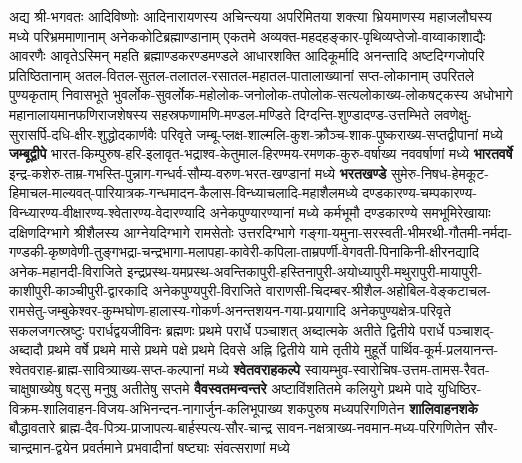 अद्य श्री-भगवतः आदिविष्णोः आदिनारायणस्य अचिन्त्यया अपरिमितया शक्त्या भ्रियमाणस्य महाजलौघस्य मध्ये
परिभ्रम\-माणानाम् अनेक\-कोटि\-ब्रह्माण्डानाम् एकतमे अव्यक्त-महदहङ्कार-पृथिव्यप्तेजो-वाय्वाकाशाद्यैः आवरणैः
आवृते\-ऽस्मिन् महति ब्रह्माण्डकरण्डमण्डले आधारशक्ति आदिकूर्मादि अनन्तादि अष्टदिग्गजोपरि
प्रतिष्ठितानाम् अतल-वितल-सुतल-तलातल-रसातल-महातल-पातालाख्यानां सप्त-लोकानाम् उपरितले
पुण्यकृताम् निवासभूते
भुवर्लोक-सुवर्लोक-महोलोक-जनोलोक-तपोलोक-सत्यलोकाख्य-लोकषट्कस्य अधोभागे महानालायमान\-फणि\-राज\-शेषस्य
सहस्र\-फणामणि-मण्डल-मण्डिते दिग्दन्ति-शुण्डादण्ड-उत्तम्भिते
लवणेक्षु-सुरासर्पि-दधि-क्षीर-शुद्धोदकार्णवैः परिवृते
जम्बू-प्लक्ष-शाल्मलि-कुश-क्रौञ्च-शाक-पुष्कराख्य-सप्तद्वीपानां मध्ये \textbf{जम्बूद्वीपे}
भारत-किम्पुरुष-हरि-इलावृत-भद्राश्व-केतुमाल-हिरण्मय-रमणक-कुरु-वर्षाख्य नववर्षाणां मध्ये \textbf{भारतवर्षे}
इन्द्र-कशेरु-ताम्र-गभस्ति-पुन्नाग-गन्धर्व-सौम्य-वरुण-भरत-खण्डानां मध्ये \textbf{भरतखण्डे}
सुमेरु-निषध-हेमकूट-हिमाचल-माल्यवत्-पारियात्रक-गन्धमादन-कैलास-विन्ध्याचलादि-महा\-शैल\-मध्ये
दण्डकारण्य-चम्पकारण्य-विन्ध्यारण्य-वीक्षारण्य-श्वेतारण्य-वेदारण्यादि अनेक\-पुण्या\-रण्यानां मध्ये
कर्मभूमौ दण्डकारण्ये समभूमिरेखायाः दक्षिणदिग्भागे श्रीशैलस्य आग्नेयदिग्भागे रामसेतोः उत्तर\-दिग्भागे
गङ्गा-यमुना-सरस्वती-भीमरथी-गौतमी-नर्मदा-गण्डकी-कृष्णवेणी-तुङ्गभद्रा-चन्द्रभागा-मलापहा-कावेरी-कपिला-ताम्रपर्णी-वेगवती-पिनाकिनी-क्षीरनद्यादि
अनेक-महानदी-विराजिते
इन्द्रप्रस्थ-यमप्रस्थ-अवन्तिका\-पुरी-हस्तिनापुरी-अयोध्या\-पुरी-मथुरा\-पुरी-मायापुरी-काशीपुरी-काञ्चीपुरी-द्वारकादि अनेक\-पुण्यपुरी-विराजिते
वाराणसी-चिदम्बर-श्रीशैल-अहोबिल-वेङ्कटाचल-रामसेतु-जम्बुकेश्वर-कुम्भघोण-हालास्य-गोकर्ण-अनन्तशयन-गया-प्रयागादि
अनेकपुण्यक्षेत्र-परिवृते सकलजगत्स्रष्टुः परार्धद्वयजीविनः ब्रह्मणः प्रथमे परार्धे पञ्चाशत्
अब्दात्मके अतीते द्वितीये परार्धे पञ्चाशद्-अब्दादौ प्रथमे वर्षे प्रथमे मासे प्रथमे पक्षे प्रथमे
दिवसे अह्नि द्वितीये यामे तृतीये मुहूर्ते
पार्थिव-कूर्म-प्रलयानन्त-श्वेतवराह-ब्राह्म-सावित्र्याख्य-सप्त-कल्पानां मध्ये \textbf{श्वेतवराहकल्पे}
स्वायम्भुव-स्वारोचिष-उत्तम-तामस-रैवत-चाक्षुषाख्येषु षट्सु मनुषु अतीतेषु सप्तमे \textbf{वैवस्वतमन्वन्तरे}
अष्टाविंशतितमे कलियुगे प्रथमे पादे युधिष्ठिर-विक्रम-शालिवाहन-विजय-अभिनन्दन-नागार्जुन-कलिभूपाख्य
शकपुरुष मध्यपरि\-गणितेन \textbf{शालिवाहनशके} बौद्धावतारे ब्राह्म-दैव-पित्र्य-प्राजापत्य-बार्हस्पत्य-सौर-चान्द्र
सावन-नक्षत्राख्य-नवमान-मध्य-परि\-गणितेन सौर-चान्द्रमान-द्वयेन प्रवर्तमाने प्रभवादीनां षष्ट्याः
संवत्सराणां मध्ये
\yutithyadi

